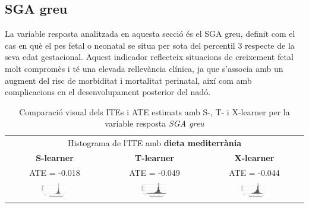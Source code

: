 \documentclass[../main.tex]{subfiles}
\begin{document}
    
    \subsection{SGA greu}\label{subsec:severeSGA}

    La variable resposta analitzada en aquesta secció és el SGA greu, definit com el cas en què el pes fetal o neonatal se situa per sota del percentil 3 respecte de la seva edat gestacional. Aquest indicador reflecteix situacions de creixement fetal molt compromès i té una elevada rellevància clínica, ja que s’associa amb un augment del risc de morbiditat i mortalitat perinatal, així com amb complicacions en el desenvolupament posterior del nadó.

    \begin{table}[H]
        \centering
        \begin{tabular}{ccc}
        \multicolumn{3}{c}{Histograma de l'ITE amb \textbf{dieta mediterrània}} \\
        \small \textbf{S-learner} & \small \textbf{T-learner} & \small \textbf{X-learner} \\
        \footnotesize ATE = -0.018 & \footnotesize ATE = -0.049 & \footnotesize ATE = -0.044 \\
        \includegraphics[width=0.3\textwidth]{imgs/histogrames/hist(severeSGA)S_tract2.jpg} &
        \includegraphics[width=0.3\textwidth]{imgs/histogrames/hist(severeSGA)T_tract2.jpg} &
        \includegraphics[width=0.3\textwidth]{imgs/histogrames/hist(severeSGA)X_tract2.jpg} \\
        \end{tabular}
        \caption{\footnotesize Comparació visual dels ITEs i ATE estimats amb S-, T- i X-learner per la variable resposta \textit{SGA greu}}
        \label{tab:histITE_severeSGA2}
    \end{table}
\end{document}

